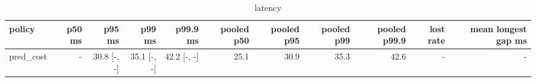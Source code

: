 \begin{table}[t]\centering\small
\begin{tabular}{lrrrrrrrrrr}\toprule
policy & p50 ms & p95 ms & p99 ms & p99.9 ms & pooled p50 & pooled p95 & pooled p99 & pooled p99.9 & lost rate & mean longest gap ms \\\midrule
pred\_cost & - & 30.8 [-, -] & 35.1 [-, -] & 42.2 [-, -] & 25.1 & 30.9 & 35.3 & 42.6 & - & - \\
\bottomrule\end{tabular}\caption{latency}\end{table}
